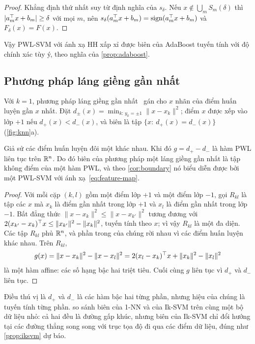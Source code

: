 \begin{proof}
Khẳng định thứ nhất suy từ định nghĩa của $s_\delta$. Nếu $x\notin\bigcup_mS_m(\delta)$ thì $|a_m^\top x+b_m|\ge\delta$ với mọi $m$, nên $s_\delta(a_m^\top x+b_m)=\operatorname{sign}(a_m^\top x+b_m)$ và $F_\delta(x)=F(x)$.
\end{proof}

Vậy PWL-SVM với ánh xạ HH xấp xỉ được biên của AdaBoost tuyến tính với độ chính xác tùy ý, theo nghĩa của \cref{prop:adaboost}.

\subsection{Phương pháp láng giềng gần nhất}

Với $k=1$, phương pháp láng giềng gần nhất~\cite{cover1967} gán cho $x$ nhãn của điểm huấn luyện gần $x$ nhất. Đặt $d_\pm(x)=\min_{k:\,y_k=\pm1}\|x-x_k\|^2$; điểm $x$ được xếp vào lớp $+1$ nếu $d_+(x)<d_-(x)$, và biên là tập $\{x:\ d_+(x)=d_-(x)\}$ (\cref{fig:knn}a).

\begin{proposition}\label{prop:knn}
Giả sử các điểm huấn luyện đôi một khác nhau. Khi đó $g=d_+-d_-$ là hàm PWL liên tục trên $\mathbb{R}^n$. Do đó biên của phương pháp một láng giềng gần nhất là tập không điểm của một hàm PWL, và theo \cref{cor:boundary} nó biểu diễn được bởi một PWL-SVM với ánh xạ~\eqref{eq:feature-map}.
\end{proposition}

\begin{proof}
Với mỗi cặp $(k,l)$ gồm một điểm lớp $+1$ và một điểm lớp $-1$, gọi $R_{kl}$ là tập các $x$ mà $x_k$ là điểm gần nhất trong lớp $+1$ và $x_l$ là điểm gần nhất trong lớp $-1$. Bất đẳng thức $\|x-x_k\|^2\le\|x-x_{k'}\|^2$ tương đương với $2(x_{k'}-x_k)^\top x\le\|x_{k'}\|^2-\|x_k\|^2$, tuyến tính theo $x$; vì vậy $R_{kl}$ là một đa diện. Các tập $R_{kl}$ phủ $\mathbb{R}^n$, và phần trong của chúng rời nhau vì các điểm huấn luyện khác nhau. Trên $R_{kl}$,
\[
g(x)=\|x-x_k\|^2-\|x-x_l\|^2=2(x_l-x_k)^\top x+\|x_k\|^2-\|x_l\|^2
\]
là một hàm affine: các số hạng bậc hai triệt tiêu. Cuối cùng $g$ liên tục vì $d_+$ và $d_-$ liên tục.
\end{proof}

Điều thú vị là $d_+$ và $d_-$ là các hàm bậc hai từng phần, nhưng hiệu của chúng là tuyến tính từng phần.  so sánh biên của 1-NN và của Ik-SVM trên cùng một bộ dữ liệu nhỏ: cả hai đều là đường gấp khúc, nhưng biên của Ik-SVM chỉ đổi hướng tại các đường thẳng song song với trục tọa độ đi qua các điểm dữ liệu, đúng như \cref{prop:iksvm} dự báo.

